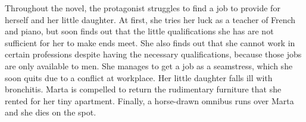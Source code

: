 Throughout the novel, the protagonist struggles to find a job to provide for herself and her little daughter.
At first, she tries her luck as a teacher of French and piano, but soon finds out that the little qualifications she has are not sufficient for her to make ends meet.
She also finds out that she cannot work in certain professions despite having the necessary qualifications, because those jobs are only available to men.
She manages to get a job as a seamstress, which she soon quits due to a conflict at workplace.
Her little daughter falls ill with bronchitis.
Marta is compelled to return the rudimentary furniture that she rented for her tiny apartment.
Finally, a horse-drawn omnibus runs over Marta and she dies on the spot.
